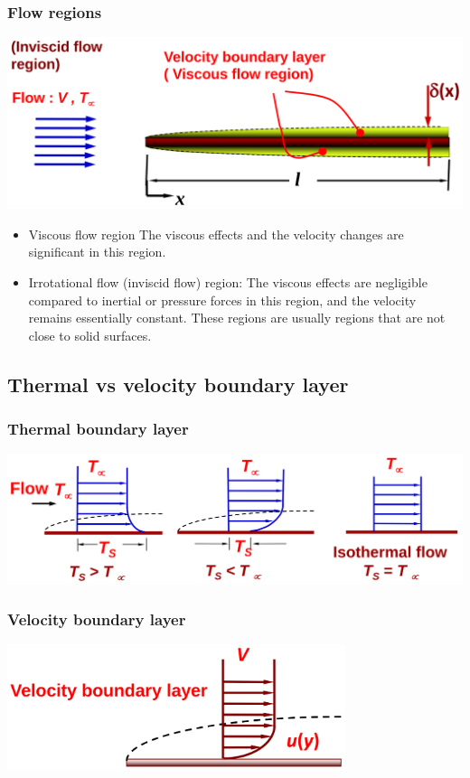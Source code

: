 \documentclass[11pt]{article}
\begin{document}
\subsubsection{Flow regions}
\label{sec:org3ec828e}
\begin{center}
\includegraphics[width=.9\linewidth]{./images/velocity-boundary-layer-flow-regions-diagram.png}
\end{center}
\begin{itemize}
\item Viscous flow region
The viscous effects and the velocity changes are significant in this region.

\item Irrotational flow (inviscid flow) region:
The viscous effects are negligible compared to inertial or pressure forces in this region, and the velocity remains essentially constant. These regions are usually regions that are not close to solid surfaces.
\end{itemize}
\subsection{Thermal vs velocity boundary layer}
\label{sec:org1a66d8e}

\subsubsection{Thermal boundary layer}
\label{sec:org5880b70}
\begin{center}
\includegraphics[width=.9\linewidth]{./images/thermal-boundary-layer-all-three-flows.png}
\end{center}
\subsubsection{Velocity boundary layer}
\label{sec:org7481355}
\begin{center}
\includegraphics[height=10em]{./images/velocity-boundary-layer-simplified-diagram.png}
\end{center}
\end{document}
